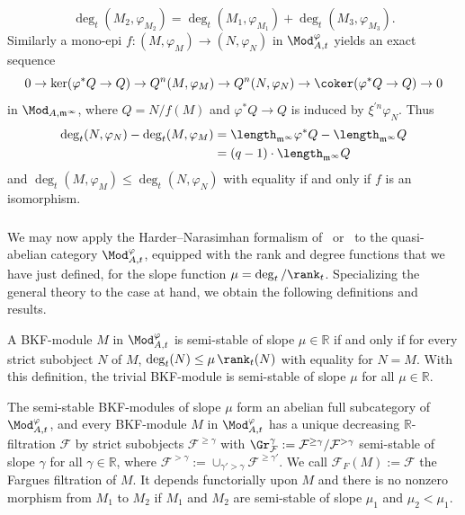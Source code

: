 \[
\deg_{t}(M_{2},\varphi_{M_{2}})=\deg_{t}(M_{1},\varphi_{M_{1}})+\deg_{t}(M_{3},\varphi_{M_{3}}).
\]
Similarly a mono-epi $f:(M,\varphi_{M})\rightarrow(N,\varphi_{N})$ in $\Mod_{A,t}^{\varphi}$ yields an exact sequence
\[
0\rightarrow\ker(\varphi^{\ast}Q\rightarrow Q)\rightarrow Q^{n}(M,\varphi_{M})\rightarrow Q^{n}(N,\varphi_{N})\rightarrow\coker(\varphi^{\ast}Q\rightarrow Q)\rightarrow0
\]
in $\Mod_{A,\mathfrak{m}^{\infty}}$, where $Q=N/f(M)$ and $\varphi^{\ast}Q\rightarrow Q$ is induced by $\xi^{\prime n}\varphi_{N}$. Thus
\begin{align*}
\deg_{t}(N,\varphi_{N})-\deg_{t}(M,\varphi_{M}) & = \length_{\mathfrak{m}^{\infty}}\varphi^{\ast}Q-\length_{\mathfrak{m}^{\infty}}Q\\
& = (q-1)\cdot\length_{\mathfrak{m}^{\infty}}Q
\end{align*}
and $\deg_{t}(M,\varphi_{M})\leq\deg_{t}(N,\varphi_{N})$ with equality if and only if $f$ is an isomorphism.

\subsubsection{}

We may now apply the Harder--Narasimhan formalism of~\cite{An09} or~\cite{Co16} to the quasi-abelian category $\Mod_{A,t}^{\varphi}$, equipped with the rank and degree functions that we have just defined, for the slope function $\mu=\deg_{t}/\rank_{t}$. Specializing the general theory to the case at hand, we obtain the following definitions and results.

A BKF-module $M$ in $\Mod_{A,t}^{\varphi}$ is semi-stable of slope $\mu\in\mathbb{R}$ if and only if for every strict subobject $N$ of $M$, $\deg_{t}(N)\leq\mu\,\rank_{t}(N)$ with equality for $N=M$. With this definition, the trivial BKF-module is semi-stable of slope $\mu$ for all $\mu\in\mathbb{R}$.

The semi-stable BKF-modules of slope $\mu$ form an abelian full subcategory of $\Mod_{A,t}^{\varphi}$, and every BKF-module $M$ in $\Mod_{A,t}^{\varphi}$ has a unique decreasing $\mathbb{R}$-filtration $\mathcal{F}$ by strict subobjects $\mathcal{F}^{\geq\gamma}$ with $\Gr_{\mathcal{F}}^{\gamma}:=\mathcal{F}^{\geq\gamma}/\mathcal{F}^{>\gamma}$ semi-stable of slope $\gamma$ for all $\gamma\in\mathbb{R}$, where $\mathcal{F}^{>\gamma}:=\cup_{\gamma'>\gamma}\mathcal{F}^{\geq\gamma'}$. We call $\mathcal{F}_{F}(M):=\mathcal{F}$ the Fargues filtration of $M$. It depends functorially upon $M$ and there is no nonzero morphism from $M_{1}$ to $M_{2}$ if $M_{1}$ and $M_{2}$ are semi-stable of slope $\mu_{1}$ and $\mu_{2}<\mu_{1}$.

